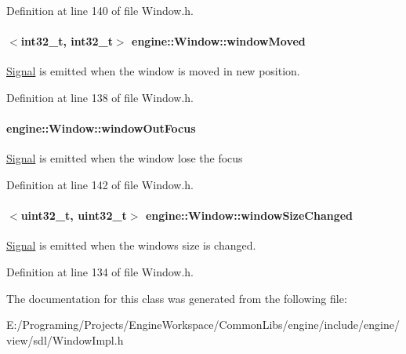 Definition at line 140 of file Window.\+h.

\paragraph[{\texorpdfstring{window\+Moved}{windowMoved}}]{$<$int32\+\_\+t, int32\+\_\+t$>$ engine\+::\+Window\+::window\+Moved\hspace{0.3cm}{\ttfamily [inherited]}}\hypertarget{a00082_a4bdb42d789ed9587ff8f840065752506}{}\label{a00082_a4bdb42d789ed9587ff8f840065752506}
\hyperlink{a00065}{Signal} is emitted when the window is moved in new position. 

Definition at line 138 of file Window.\+h.

\paragraph[{\texorpdfstring{window\+Out\+Focus}{windowOutFocus}}]{ engine\+::\+Window\+::window\+Out\+Focus\hspace{0.3cm}{\ttfamily [inherited]}}\hypertarget{a00082_af6f8cc0d616685683d5c6b52b4cc07d0}{}\label{a00082_af6f8cc0d616685683d5c6b52b4cc07d0}
\hyperlink{a00065}{Signal} is emitted when the window lose the focus 

Definition at line 142 of file Window.\+h.

\paragraph[{\texorpdfstring{window\+Size\+Changed}{windowSizeChanged}}]{$<$uint32\+\_\+t, uint32\+\_\+t$>$ engine\+::\+Window\+::window\+Size\+Changed\hspace{0.3cm}{\ttfamily [inherited]}}\hypertarget{a00082_a20978a09b8843aa8960dc9d3a989b11a}{}\label{a00082_a20978a09b8843aa8960dc9d3a989b11a}
\hyperlink{a00065}{Signal} is emitted when the window\textquotesingle{}s size is changed. 

Definition at line 134 of file Window.\+h.



The documentation for this class was generated from the following file\+:\begin{DoxyCompactItemize}
\item 
E\+:/\+Programing/\+Projects/\+Engine\+Workspace/\+Common\+Libs/engine/include/engine/view/sdl/Window\+Impl.\+h\end{DoxyCompactItemize}
